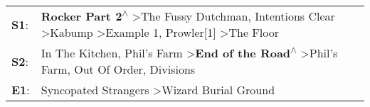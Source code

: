 \begin{supertabular}{p{0.03\textwidth}p{0.92\textwidth}}
 \textbf{S1}:  &  \textbf{Rocker Part 2\textsuperscript{$\wedge$}} \textgreater \enspace The Fussy Dutchman\textsuperscript{}, \enspace Intentions Clear\textsuperscript{} \textgreater \enspace Kabump\textsuperscript{} \textgreater \enspace Example 1\textsuperscript{}, \enspace Prowler[1]\textsuperscript{} \textgreater \enspace The Floor\textsuperscript{}  \enspace  \\
 \textbf{S2}:  &                                                                In The Kitchen\textsuperscript{}, \enspace Phil's Farm\textsuperscript{} \textgreater \enspace \textbf{End of the Road\textsuperscript{$\wedge$}} \textgreater \enspace Phil's Farm\textsuperscript{}, \enspace Out Of Order\textsuperscript{}, \enspace Divisions\textsuperscript{}  \enspace  \\
 \textbf{E1}:  &                                                                                                                                                                                                                                                 Syncopated Strangers\textsuperscript{} \textgreater \enspace Wizard Burial Ground\textsuperscript{}  \enspace  \\
\end{supertabular}
